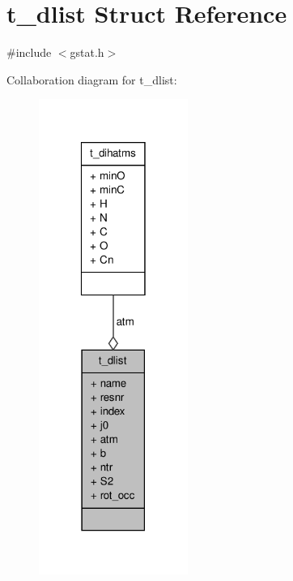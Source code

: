 \hypertarget{structt__dlist}{\section{t\-\_\-dlist \-Struct \-Reference}
\label{structt__dlist}
}


{\ttfamily \#include $<$gstat.\-h$>$}



\-Collaboration diagram for t\-\_\-dlist\-:
\nopagebreak
\begin{figure}[H]
\begin{center}
\leavevmode
\includegraphics[width=138pt]{structt__dlist__coll__graph}
\end{center}
\end{figure}
